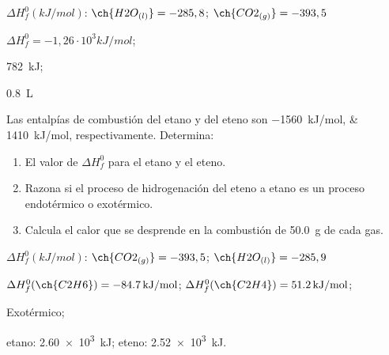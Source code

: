 \documentclass[10pt]{article}
\newenvironment{gexdatos}{
    \noindent\makebox[0pt][r]{\textit{Datos:}}
}{\vspace{5pt}}
\begin{document}
\begin{multicols}{2}
\begin{exercise}
  \begin{gexdatos}
    \( \Delta H^0_f (\si{kJ/mol}) \): \( \ch{H2O_{(l)}} = -285,8 \); \( \ch    {CO2_{(g)}} = -393,5 \)
  \end{gexdatos}

\end{exercise}

\begin{solution}
  \begin{enumerate*}
    \item \( \Delta H^0_f = -1,26·10^3 kJ/mol \); \item \SI{782}{kJ}; \item \SI{0.8}{\liter}
  \end{enumerate*}
\end{solution}

\begin{exercise}
  Las entalpías de combustión del etano y del eteno son
  \SIlist{-1560;1410}{kJ/mol}, respectivamente. Determina:
  \begin{enumerate}
    \item El valor de \( \Delta H^0_f \) para el etano y el eteno.
    \item Razona si el proceso de hidrogenación del eteno a etano
    es un proceso endotérmico o exotérmico.
    \item Calcula el calor que se desprende en la combustión de
    \SI{50.0}{\gram} de cada gas.
  \end{enumerate}

  \begin{gexdatos}
    \( \Delta H^0_f (\si{kJ/mol}) \): \( \ch{CO2_{(g)}} = -393,5 \); \( \ch{H2O_{(l)}} = -285,9 \)
  \end{gexdatos}

\end{exercise}

\begin{solution}
  \begin{enumerate*}
    \item \( \Delta H^0_f (\ch{C2H6})= \SI{-84,7}{kJ/mol} \); \( \Delta H^0_f (\ch{C2H4}) = \SI{51.2}{kJ/mol} \); \item Exotérmico; \item etano: \SI{2.60e3}{kJ}; eteno: \SI{2.52e3}{kJ}.
  \end{enumerate*}
\end{solution}


\end{multicols}
\end{document}
